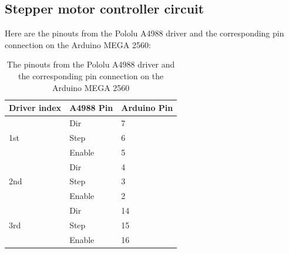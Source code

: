 \subsection{Stepper motor controller circuit}
Here are the pinouts from the Pololu A4988 driver and the corresponding pin connection on the Arduino MEGA 2560:
\begin{table}[H]
	\centering
	\caption{The pinouts from the Pololu A4988 driver and the corresponding pin connection on the Arduino MEGA 2560}	
	\label{tab:A4988_connectto_Arduino}
	\begin{tabularx}{0.65\textwidth}{lll}
		\toprule
		\textbf{Driver index} & \textbf{A4988 Pin} & \textbf{Arduino Pin} \\
		\midrule
		\multirow{3}{*}{1st}	& Dir       & 7            \\
		                   	 	& Step      & 6            \\
		                   	 	& Enable    & 5            \\
		\midrule
		\multirow{3}{*}{2nd} 	& Dir       & 4            \\
		                   	 	& Step      & 3            \\
		                   	 	& Enable    & 2            \\
       	\midrule
      	\multirow{3}{*}{3rd} 	& Dir       & 14           \\
		                   	 	& Step      & 15           \\
		                   		& Enable    & 16           \\
		\bottomrule
	\end{tabularx}
\end{table}

